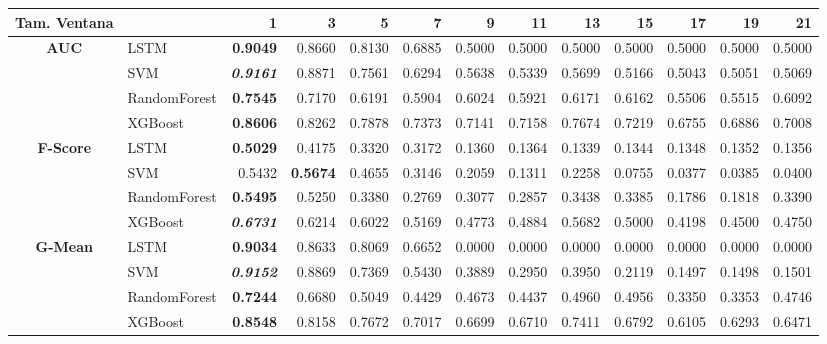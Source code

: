 \begin{table}[H]
\centering
\begin{adjustbox}{max width=12cm}
	\begin{tabular}{|c|l|r|r|r|r|r|r|r|r|r|r|r|}
		\hline
		\textbf{Tam. Ventana} &         &      1  &      3  &      5  &      7  &      9  &      11 &      13 &      15 &      17 &      19 &      21 \\
		\hline
		\textbf{AUC} &  LSTM & \textbf{  0.9049 } &  0.8660 &  0.8130 &  0.6885 &  0.5000 &  0.5000 &  0.5000 &  0.5000 &  0.5000 &  0.5000 &  0.5000 \\
		&  SVM & \textit{ \textbf{  0.9161 } } &  0.8871 &  0.7561 &  0.6294 &  0.5638 &  0.5339 &  0.5699 &  0.5166 &  0.5043 &  0.5051 &  0.5069 \\
		&  RandomForest & \textbf{  0.7545 } &  0.7170 &  0.6191 &  0.5904 &  0.6024 &  0.5921 &  0.6171 &  0.6162 &  0.5506 &  0.5515 &  0.6092 \\
		&  XGBoost & \textbf{  0.8606 } &  0.8262 &  0.7878 &  0.7373 &  0.7141 &  0.7158 &  0.7674 &  0.7219 &  0.6755 &  0.6886 &  0.7008 \\
		\hline
		\textbf{F-Score}&  LSTM & \textbf{  0.5029 } &  0.4175 &  0.3320 &  0.3172 &  0.1360 &  0.1364 &  0.1339 &  0.1344 &  0.1348 &  0.1352 &  0.1356 \\
		&  SVM &  0.5432 & \textbf{  0.5674 } &  0.4655 &  0.3146 &  0.2059 &  0.1311 &  0.2258 &  0.0755 &  0.0377 &  0.0385 &  0.0400 \\
		&  RandomForest & \textbf{  0.5495 } &  0.5250 &  0.3380 &  0.2769 &  0.3077 &  0.2857 &  0.3438 &  0.3385 &  0.1786 &  0.1818 &  0.3390 \\
		&  XGBoost & \textit{ \textbf{  0.6731 } } &  0.6214 &  0.6022 &  0.5169 &  0.4773 &  0.4884 &  0.5682 &  0.5000 &  0.4198 &  0.4500 &  0.4750 \\
		\hline
		\textbf{G-Mean} &  LSTM & \textbf{  0.9034 } &  0.8633 &  0.8069 &  0.6652 &  0.0000 &  0.0000 &  0.0000 &  0.0000 &  0.0000 &  0.0000 &  0.0000 \\
		&  SVM & \textit{ \textbf{  0.9152 } } &  0.8869 &  0.7369 &  0.5430 &  0.3889 &  0.2950 &  0.3950 &  0.2119 &  0.1497 &  0.1498 &  0.1501 \\
		&  RandomForest & \textbf{  0.7244 } &  0.6680 &  0.5049 &  0.4429 &  0.4673 &  0.4437 &  0.4960 &  0.4956 &  0.3350 &  0.3353 &  0.4746 \\
		&  XGBoost & \textbf{  0.8548 } &  0.8158 &  0.7672 &  0.7017 &  0.6699 &  0.6710 &  0.7411 &  0.6792 &  0.6105 &  0.6293 &  0.6471 \\

\end{tabular}
\end{adjustbox}
\end{table}
